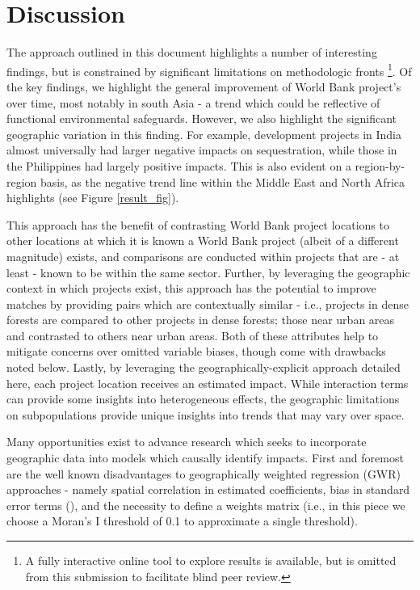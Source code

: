 \documentclass{article}\usepackage[]{graphicx}\usepackage[]{color}
\newenvironment{knitrout}{}{}  %
\begin{document}
\begin{knitrout}
\section{Discussion}
The approach outlined in this document highlights a number of interesting findings, but is constrained by significant limitations on methodologic fronts \footnote{A fully interactive online tool to explore results is available, but is omitted from this submission to facilitate blind peer review.}.  
Of the key findings, we highlight the general improvement of World Bank project's over time, most notably in south Asia - a trend which could be reflective of functional environmental safeguards.  
However, we also highlight the significant geographic variation in this finding.  For example, development projects in India almost universally had larger negative impacts on sequestration, while those in the Philippines had largely positive impacts.  
This is also evident on a region-by-region basis, as the negative trend line within the Middle East and North Africa highlights (see Figure \ref{result_fig}).  
\par
This approach has the benefit of contrasting World Bank project locations to other locations at which it is known a World Bank project (albeit of a different magnitude) exists, and comparisons are conducted within projects that are - at least - known to be within the same sector. 
Further, by leveraging the geographic context in which projects exist, this approach has the potential to improve matches by providing pairs which are contextually similar - i.e., projects in dense forests are compared to other projects in dense forests; those near urban areas and contrasted to others near urban areas.
Both of these attributes help to mitigate concerns over omitted variable biases, though come with drawbacks noted below.
Lastly, by leveraging the geographically-explicit approach detailed here, each project location receives an estimated impact.
While interaction terms can provide some insights into heterogeneous effects, the geographic limitations on subpopulations provide unique insights into trends that may vary over space.
\par
Many opportunities exist to advance research which seeks to incorporate geographic data into models which causally identify impacts.
First and foremost are the well known disadvantages to geographically weighted regression (GWR) approaches - namely spatial correlation in estimated coefficients, bias in standard error terms (\cite{wheeler_multicollinearity_2005}), and the necessity to define a weights matrix (i.e., in this piece we choose a Moran's I threshold of 0.1 to approximate a single threshold).  

\end{knitrout}
\end{document}
